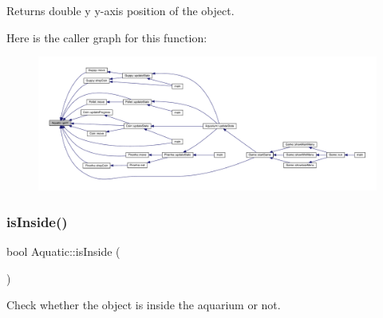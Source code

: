 \begin{DoxyReturn}{Returns}
double y y-\/axis position of the object. 
\end{DoxyReturn}
Here is the caller graph for this function\+:
\nopagebreak
\begin{figure}[H]
\begin{center}
\leavevmode
\includegraphics[width=350pt]{class_aquatic_aadfede87649072d59192d923200b6fc3_icgraph}
\end{center}
\end{figure}
\mbox{\label{class_aquatic_a2c438132d8b625d3c2187ff5735193a0}} 
\subsubsection{\texorpdfstring{is\+Inside()}{isInside()}}
{\footnotesize\ttfamily bool Aquatic\+::is\+Inside (\begin{DoxyParamCaption}{ }\end{DoxyParamCaption})}



Check whether the object is inside the aquarium or not. 


